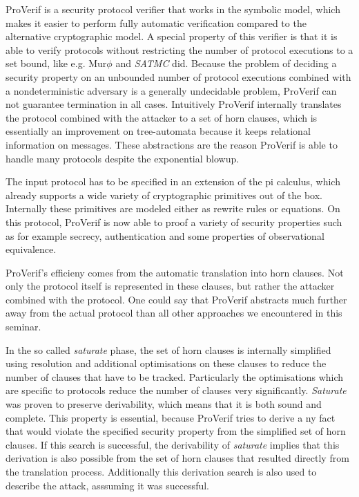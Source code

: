 \documentclass[a4paper,UKenglish]{lipics-v2018}
\def\murphi{Mur$\phi$ }
\begin{document}
ProVerif is a security protocol verifier that works in the symbolic model, which makes it easier to perform fully automatic verification compared to the alternative cryptographic model. 
A special property of this verifier is that it is able to verify protocols without restricting the number of protocol executions to a set bound, like e.g. \murphi \cite{murphi} and \textit{SATMC}\cite{sat} did. Because the problem of deciding a security property on an unbounded number of protocol executions combined with a nondeterministic adversary is a generally undecidable problem, ProVerif can not guarantee termination in all cases. Intuitively ProVerif internally translates the protocol combined with the attacker to a set of horn clauses, which is essentially an improvement on tree-automata because it keeps relational information on messages. These abstractions are the reason ProVerif is able to handle many protocols despite the exponential blowup.\cite{ProVerif}

The input protocol has to be specified in an extension of the pi calculus, which already supports a wide variety of cryptographic primitives out of the box. Internally these primitives are modeled either as rewrite rules or equations. On this protocol, ProVerif is now able to proof a variety of security properties such as for example secrecy, authentication and some properties of observational equivalence.\cite{ProVerif}

ProVerif's efficieny comes from the automatic translation into horn clauses. Not only the protocol itself is represented in these clauses, but rather the attacker combined with the protocol. One could say that ProVerif abstracts much further away from the actual protocol than all other approaches we encountered in this seminar.\cite{ProVerif}

In the so called \textit{saturate} phase, the set of horn clauses is internally simplified using resolution and additional optimisations on these clauses to reduce the number of clauses that have to be tracked. Particularly the optimisations which are specific to protocols reduce the number of clauses very significantly. \textit{Saturate} was proven to preserve derivability, which means that it is both sound and complete. This property is essential, because ProVerif tries to derive a ny fact that would violate the specified security property from the simplified set of horn clauses. If this search is successful, the derivability of \textit{saturate} implies that this derivation is also possible from the set of horn clauses that resulted directly from the translation process. Additionally this derivation search is also used to describe the attack, asssuming it was successful.\cite{ProVerif}
\end{document}
